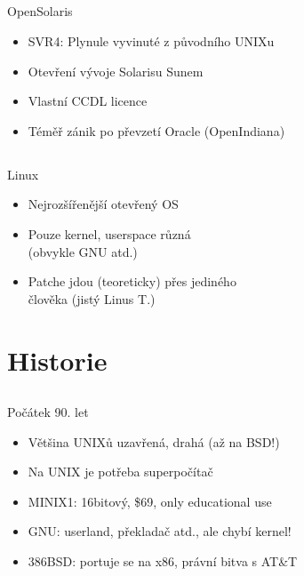 \documentclass{beamer}
\begin{document}
\subsection{}
\begin{frame}{OpenSolaris}
\begin{itemize}
\item SVR4: Plynule vyvinuté z původního UNIXu
\item Otevření vývoje Solarisu Sunem
\item Vlastní CCDL licence
\item Téměř zánik po převzetí Oracle (OpenIndiana)
\end{itemize}
\end{frame}

\subsection{}
\begin{frame}{Linux}
\begin{itemize}
\item Nejrozšířenější otevřený OS
\item Pouze kernel, userspace různá \\ (obvykle GNU atd.)
\item Patche jdou (teoreticky) přes jediného \\ člověka (jistý Linus T.)
\end{itemize}
\end{frame}


\section{Historie}

\subsection{}
\begin{frame}{Počátek 90. let}
\begin{itemize}
\item Většina UNIXů uzavřená, drahá (až na BSD!)
\item Na UNIX je potřeba superpočítač
\item MINIX1: 16bitový, \$69, only educational use
\item GNU: userland, překladač atd., ale chybí kernel!
\item 386BSD: portuje se na x86, právní bitva s AT\&T
\end{itemize}
\end{frame}
\end{document}
